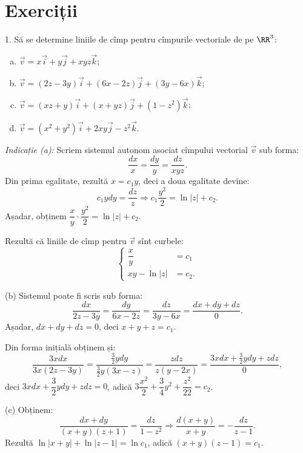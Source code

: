 
\section{Exerciții}

1. Să se determine liniile de cîmp pentru cîmpurile vectoriale de pe $\RR^3$:
\begin{enumerate}[(a)]
\item $\vec{v} = x\vec{i} + y \vec{j} + xyz \vec{k}$;
\item $\vec{v} = (2z - 3y)\vec{i} + (6x - 2z)\vec{j} + (3y - 6x)\vec{k}$;
\item $\vec{v} = (xz + y) \vec{i} + (x + yz) \vec{j} + (1 - z^2)\vec{k}$;
\item $\vec{v} = (x^2 + y^2)\vec{i} + 2xy \vec{j} - z^2 \vec{k}$.
\end{enumerate}

\emph{Indicație (a):} Scriem sistemul autonom asociat cîmpului vectorial $\vec{v}$
sub forma:
\[
  \frac{dx}{x} = \frac{dy}{y} = \frac{dz}{xyz}.
\]
Din prima egalitate, rezultă $x = c_1 y$, deci a doua egalitate devine:
\[
  c_1 ydy = \frac{dz}{z} \Rightarrow c_1 \frac{y^2}{2} = \ln |z| + c_2.
\]
Așadar, obținem $\dfrac{x}{y} \cdot \dfrac{y^2}{2} = \ln |z| + c_2$.

Rezultă că liniile de cîmp pentru $\vec{v}$ sînt curbele:
\[
  \begin{cases}
    \dfrac{x}{y} &= c_1 \\
    xy - \ln|z| &= c_2.
  \end{cases}
\]

\vspace{1cm}

(b) Sistemul poate fi scris sub forma:
\[
  \frac{dx}{2z - 3y} = \frac{dy}{6x - 2z} = \frac{dz}{3y-6x} = \frac{dx + dy + dz}{0}.
\]
Așadar, $dx + dy + dz = 0$, deci $x + y + z = c_1$.

Din forma inițială obținem și:
\[
  \frac{3xdx}{3x(2z - 3y)} = \frac{\frac{3}{2}ydy}{\frac{3}{2}y(3x - z)} = \frac{zdz}{z(y - 2x)} = %
  \frac{3xdx + \frac{3}{2}ydy + zdz}{0},
\]
deci $3xdx + \dfrac{3}{2}ydy + zdz = 0$, adică
$3\dfrac{x^2}{2} + \dfrac{3}{4}y^2 + \dfrac{z^2}{22} = c_2$.

\vspace{1cm}

(c) Obținem:
\[
  \frac{dx + dy}{(x + y)(z + 1)} = \frac{dz}{1 - z^2} \Rightarrow %
  \frac{d(x + y)}{x + y} = -\frac{dz}{z - 1}.
\]
Rezultă $\ln|x + y| + \ln|z - 1| = \ln c_1$, adică $(x + y)(z - 1) = c_1$.

